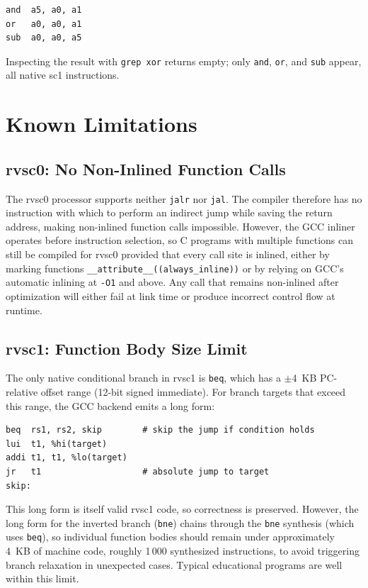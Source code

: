 \begin{lstlisting}
and  a5, a0, a1
or   a0, a0, a1
sub  a0, a0, a5
\end{lstlisting}

Inspecting the result with \texttt{grep xor} returns empty; only \texttt{and}, \texttt{or}, and
\texttt{sub} appear, all native sc1 instructions.

\section{Known Limitations}

\subsection{rvsc0: No Non-Inlined Function Calls} \label{sec:sc0-no-calls}

The rvsc0 processor supports neither \texttt{jalr} nor \texttt{jal}. The compiler therefore has no
instruction with which to perform an indirect jump while saving the return address, making non-inlined
function calls impossible. However, the GCC inliner operates before instruction selection, so C
programs with multiple functions can still be compiled for rvsc0 provided that every call site is
inlined, either by marking functions \texttt{\_\_attribute\_\_((always\_inline))} or by relying on
GCC's automatic inlining at \texttt{-O1} and above. Any call that remains non-inlined after
optimization will either fail at link time or produce incorrect control flow at runtime.

\subsection{rvsc1: Function Body Size Limit}

The only native conditional branch in rvsc1 is \texttt{beq}, which has a $\pm$4~KB PC-relative
offset range (12-bit signed immediate). For branch targets that exceed this range, the GCC backend
emits a long form:

\begin{lstlisting}
beq  rs1, rs2, skip        # skip the jump if condition holds
lui  t1, %hi(target)
addi t1, t1, %lo(target)
jr   t1                    # absolute jump to target
skip:
\end{lstlisting}

This long form is itself valid rvsc1 code, so correctness is preserved. However, the long form for
the inverted branch (\texttt{bne}) chains through the \texttt{bne} synthesis (which uses
\texttt{beq}), so individual function bodies should remain under approximately 4~KB of machine code,
roughly 1\,000 synthesized instructions, to avoid triggering branch relaxation in unexpected cases.
Typical educational programs are well within this limit.
